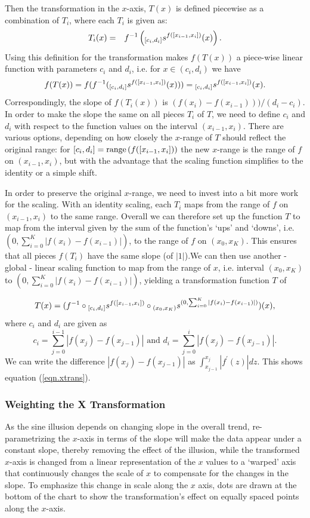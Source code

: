 \documentclass[11pt]{isuthesis}\usepackage[]{graphicx}\usepackage[]{color}
\begin{document}
Then the transformation in the $x$-axis, $T(x)$ is defined piecewise as a combination of $T_i$, where each $T_i$ is given as:
\begin{eqnarray}\label{eq.x.transformation}
T_i(x) &=& f^{-1}\left( {_{[c_i,d_i]}s^{ f([x_{i-1}, x_i])}}(x) \right). 
\end{eqnarray}
%
Using this definition for the transformation makes $f(T(x))$ a piece-wise linear function with parameters $c_i$ and $d_i$, i.e. for $x \in (c_i,d_i)$ we have
\[
f(T(x)) = f (f^{-1}({_{[c_i,d_i]}s^{ f([x_{i-1}, x_i])}}(x))) = {_{[c_i,d_i]}s^{ f([x_{i-1}, x_i])}}(x).
\]
Correspondingly, the slope of $f(T_i(x))$ is $(f(x_{i}) - f(x_{i-1})))/(d_i-c_i)$.
In order to make the slope the same on all pieces $T_i$ of $T$, we need to define $c_i$ and $d_i$ with respect to the function values on the interval $(x_{i-1}, x_i)$. There are various options, depending on how closely the $x$-range of $T$ should reflect the original range:
for $[c_i, d_i] = {\text{range}\left(f([x_{i-1}, x_i])\right)}$ the new $x$-range is the range of $f$ on $(x_{i-1}, x_i)$, but with the advantage that the scaling function simplifies to the identity or a simple shift.

In order to preserve the original $x$-range, we need to invest into a bit more work for the scaling. With an identity scaling, each $T_i$ maps from the range of $f$ on $(x_{i-1}, x_i)$ to the same range. Overall we can therefore set up the function $T$ to map from the interval given by the sum of the function's `ups' and `downs', i.e.
$(0, \sum_{i=0}^K |f(x_i) - f(x_{i-1})|)$, to the range of $f$ on $(x_0, x_K)$.  This ensures that all pieces $f(T_i)$ have the same slope (of $|1|$).We can then use another - global - linear scaling function to map from the range of $x$, i.e. interval $(x_0, x_K)$ to $(0, \sum_{i=0}^K |f(x_i) - f(x_{i-1})|)$, yielding a transformation function $T$ of

\[
T (x) =  (f^{-1} \circ {_{[c_i,d_i]}s^{ f([x_{i-1}, x_i])}} \circ {_{(x_0, x_K)}s^{ (0, \sum_{i=0}^K |f(x_i) - f(x_{i-1})|)}}) (x),  
\]
where $c_i$ and $d_i$ are given as 
\[
c_i = \sum_{j=0}^{i-1} |f(x_j) - f(x_{j-1})| \text{ and } d_i = \sum_{j=0}^{i} |f(x_j) - f(x_{j-1})|.
\]
We can write the difference $|f(x_j) - f(x_{j-1})|$ as $\int_{x_{j-1}}^{x_j} |f^\prime(z)|dz$. This shows equation (\ref{eqn.xtrans}).

\subsubsection{Weighting the X Transformation}
 As the sine illusion depends on changing slope in the overall trend,  re-parametrizing the $x$-axis in terms of the slope will make the data  appear under a  constant slope, thereby removing the effect of the illusion, while the transformed $x$-axis is changed from a linear representation of the $x$ values to a `warped' axis that continuously changes the scale of $x$ to compensate for the changes in the slope.
 To emphasize this change in scale along the $x$ axis,  dots are drawn at  the bottom of the chart  to show the transformation's effect on equally spaced points along the $x$-axis.   
\end{document}
